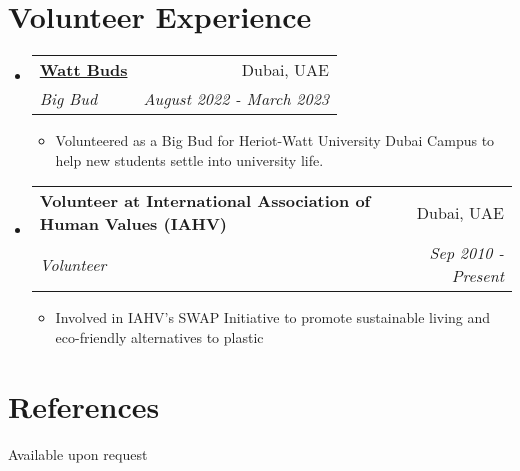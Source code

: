 \documentclass[a4paper,20pt]{article}
\makeatletter
\newcommand{\resumeItemWithoutTitle}[1]{
  \item\small{
    {#1 \vspace{-2pt}}
  }
}
\newcommand{\resumeSubheading}[4]{
  \vspace{-1pt}\item
    \begin{tabular*}{0.97\textwidth}{l@{\extracolsep{\fill}}r}
      \textbf{#1} & #2 \\
      \textit{#3} & \textit{#4} \\
    \end{tabular*}\vspace{-5pt}
}
\newcommand{\resumeSubHeadingListStart}{\begin{itemize}[leftmargin=*]}
\newcommand{\resumeSubHeadingListEnd}{\end{itemize}}
\newcommand{\resumeItemListStart}{\begin{itemize}}
\newcommand{\resumeItemListEnd}{\end{itemize}\vspace{-5pt}}
\makeatother
\begin{document}
\section{Volunteer Experience}
    \resumeSubHeadingListStart
        \resumeSubheading{\href{https://www.hw.ac.uk/uk/students/studies/wattbuds-dubai.htm}{Watt Buds}}{Dubai, UAE}
        {Big Bud}{August 2022 - March 2023}
            \resumeItemListStart
                \resumeItemWithoutTitle{Volunteered as a Big Bud for Heriot-Watt University Dubai Campus to help new students settle into university life.}
            \resumeItemListEnd
        \resumeSubheading{Volunteer at International Association of Human Values (IAHV)}{Dubai, UAE}
        {Volunteer}{Sep 2010 - Present}
            \resumeItemListStart
                \resumeItemWithoutTitle{Involved in IAHV's SWAP Initiative to promote sustainable living and eco-friendly alternatives to plastic}
            \resumeItemListEnd

\vspace{5pt}

    \resumeSubHeadingListEnd

\vspace{-5pt}
\section{References}
Available upon request
\end{document}
